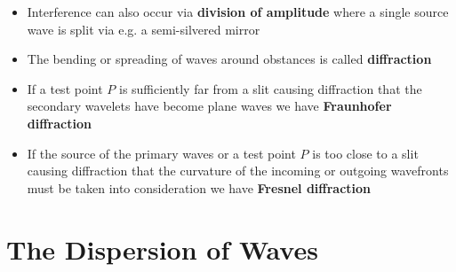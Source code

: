 \documentclass{article}
\begin{document}
\begin{itemize}
  \item Interference can also occur via \textbf{division of amplitude} where a single source wave is split via e.g. a semi-silvered mirror

  \item The bending or spreading of waves around obstances is called \textbf{diffraction}

  \item If a test point $P$ is sufficiently far from a slit causing diffraction that the secondary wavelets have become plane waves we have \textbf{Fraunhofer diffraction}

  \item If the source of the primary waves or a test point $P$ is too close to a slit causing diffraction that the curvature of the incoming or outgoing wavefronts must be taken into consideration we have \textbf{Fresnel diffraction}
\end{itemize}

\section{The Dispersion of Waves}
\end{document}
